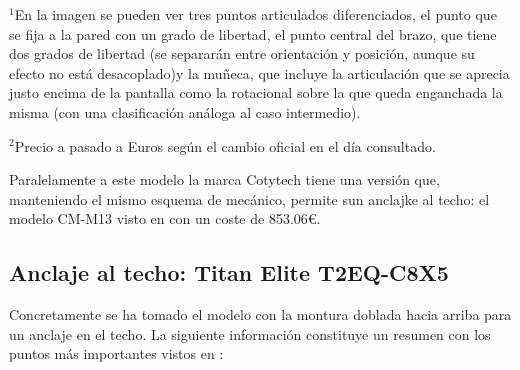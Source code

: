 \begin{minipage}{1\textwidth}
	\footnotesize{$^1$En la imagen se pueden ver tres puntos articulados diferenciados, el punto que se fija a la pared con un grado de libertad, el punto central del brazo, que tiene dos grados de libertad (se separarán entre orientación y posición, aunque su efecto no está desacoplado)y la muñeca, que incluye la articulación que se aprecia justo encima de la pantalla como la rotacional sobre la que queda enganchada la misma (con una clasificación análoga al caso intermedio).}
	
    \footnotesize{$^2$Precio a pasado a Euros según el cambio oficial en el día consultado.}
\end{minipage}

 Paralelamente a este modelo la marca Cotytech tiene una versión que, manteniendo el mismo esquema de mecánico, permite sun anclajke al techo: el modelo CM-M13 visto en \cite{CotytechCMM13:2018} con un coste de 853.06\euro.

\subsection{Anclaje al techo: Titan Elite T2EQ-C8X5}

 Concretamente se ha tomado el modelo con la montura doblada hacia arriba para un anclaje en el techo. La siguiente información constituye un resumen con los puntos más importantes vistos en \cite{TitanElite:2018}:

